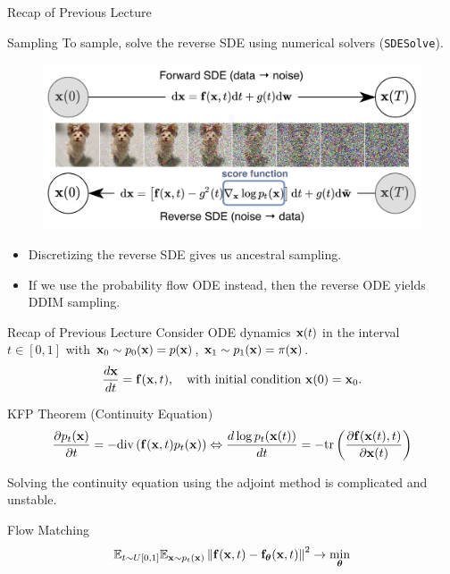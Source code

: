 \documentclass{beamer}
\begin{document}
\begin{frame}{Recap of Previous Lecture}
	\begin{block}{Sampling}
		To sample, solve the reverse SDE using numerical solvers (\texttt{SDESolve}).
		\begin{figure}
			\includegraphics[width=0.8\linewidth]{figs/sbgm}
		\end{figure}
		\vspace{-0.5cm}
	\end{block}
	\begin{itemize}
		\item Discretizing the reverse SDE gives us ancestral sampling.
		\item If we use the probability flow ODE instead, then the reverse ODE yields DDIM sampling.
	\end{itemize}
\end{frame}
\begin{frame}{Recap of Previous Lecture}
	Consider ODE dynamics $\mathbf{x}(t)$ in the interval $t \in [0, 1]$ with $\mathbf{x}_0 \sim p_0(\mathbf{x}) = p(\mathbf{x})$, $\mathbf{x}_1 \sim p_1(\mathbf{x}) =  \pi(\mathbf{x})$.
	\[
		\frac{d \mathbf{x}}{dt} = \mathbf{f} (\mathbf{x}, t),  \quad \text{with initial condition $\mathbf{x}(0) = \mathbf{x}_0$}.
	\]
	\vspace{-0.5cm}
	\begin{block}{KFP Theorem (Continuity Equation)}
		\vspace{-0.5cm}
		\[
			\frac{\partial p_t(\mathbf{x})}{\partial t} = - \text{div}\left(\mathbf{f}(\mathbf{x}, t) p_t(\mathbf{x})\right) \Leftrightarrow \frac{d \log p_t(\mathbf{x}(t))}{d t} = - \text{tr} \left( \frac{\partial \mathbf{f}(\mathbf{x}(t), t)}{\partial \mathbf{x}(t)} \right)
		\]
		\vspace{-0.3cm}
	\end{block}
	Solving the continuity equation using the adjoint method is complicated and unstable.
	\begin{block}{Flow Matching}
		\vspace{-0.3cm}
		\[
			\mathbb{E}_{t \sim U[0, 1]} \mathbb{E}_{\mathbf{x} \sim p_t(\mathbf{x})}\left\| \mathbf{f}(\mathbf{x}, t) - \mathbf{f}_{\boldsymbol{\theta}}(\mathbf{x}, t) \right\|^2 \rightarrow \min_{\boldsymbol{\theta}}
		\]
		\vspace{-0.3cm}
	\end{block}
\end{frame}
\end{document}
